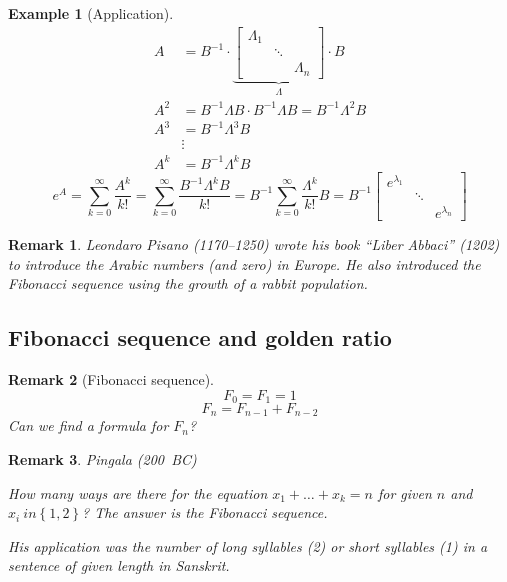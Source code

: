 \documentclass{article}
\newtheorem{example}{Example}  \numberwithin{example}{section}
\newtheorem{remark}{Remark}  \numberwithin{remark}{section}
\newcommand{\set}[1]{\left\{#1\right\}}
\begin{document}
\begin{example}[Application]
  \begin{align*}
    A &= B^{-1} \cdot \underbrace{\begin{bmatrix} \Lambda_1 & & \\ & \ddots & \\ & & \Lambda_n \end{bmatrix}}_{\Lambda} \cdot B \\
    A^2 &= B^{-1} \Lambda B \cdot B^{-1} \Lambda B = B^{-1} \Lambda^2 B \\
    A^3 &= B^{-1} \Lambda^3 B \\
        & \vdots \\
    A^k &= B^{-1} \Lambda^k B
  \end{align*}
  \[ e^A = \sum_{k=0}^\infty \frac{A^k}{k!} = \sum_{k=0}^\infty \frac{B^{-1} \Lambda^k B}{k!} = B^{-1} \sum_{k=0}^\infty \frac{\Lambda^k}{k!} B = B^{-1} \begin{bmatrix} e^{\lambda_1} & & \\ & \ddots & \\ & & e^{\lambda_n} \end{bmatrix} \]
\end{example}

\begin{remark}
  Leondaro Pisano (1170--1250) wrote his book \enquote{Liber Abbaci} (1202) to introduce the Arabic numbers (and zero) in Europe.
  He also introduced the Fibonacci sequence using the growth of a rabbit population.
\end{remark}

\subsection{Fibonacci sequence and golden ratio}

\begin{remark}[Fibonacci sequence]
  \[ F_0 = F_1 = 1 \]
  \[ F_n = F_{n-1} + F_{n-2} \]
  Can we find a formula for $F_n$?
\end{remark}

\begin{remark}
  Pingala (200~BC)

  How many ways are there for the equation $x_1 + \dots + x_k = n$ for given $n$ and $x_i \ in \set{1,2}$?
  The answer is the Fibonacci sequence.

  His application was the number of long syllables (2) or short syllables (1) in a sentence of given length in Sanskrit.
\end{remark}
\end{document}
